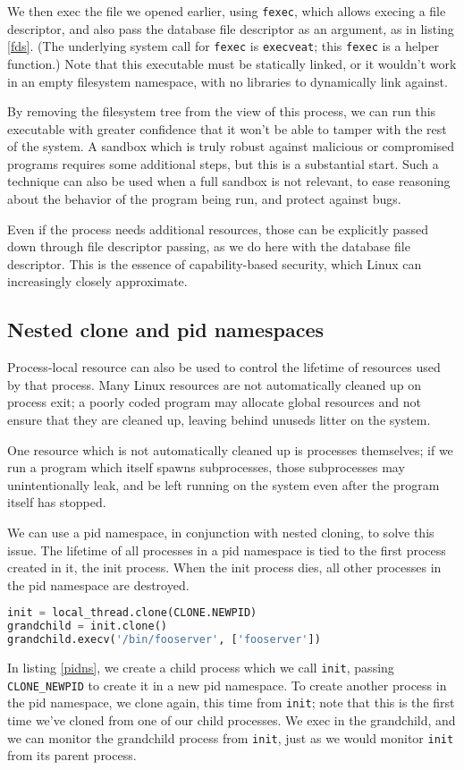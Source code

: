 \documentclass[sigplan]{acmart}
\begin{document}
We then exec the file we opened earlier, using \texttt{fexec},
which allows execing a file descriptor,
and also pass the database file descriptor as an argument,
as in listing \ref{fds}.
(The underlying system call for \texttt{fexec} is \texttt{execveat};
this \texttt{fexec} is a helper function.)
Note that this executable must be statically linked,
or it wouldn't work in an empty filesystem namespace,
with no libraries to dynamically link against.

By removing the filesystem tree from the view of this process,
we can run this executable with greater confidence
that it won't be able to tamper with the rest of the system.
A sandbox which is truly robust against malicious or compromised programs requires some additional steps,
but this is a substantial start.
Such a technique can also be used when a full sandbox is not relevant,
to ease reasoning about the behavior of the program being run,
and protect against bugs.

Even if the process needs additional resources,
those can be explicitly passed down through file descriptor passing,
as we do here with the database file descriptor.
This is the essence of capability-based security,
which Linux can increasingly closely approximate.
\subsection{Nested clone and pid namespaces}
Process-local resource can also be used to control the lifetime of resources used by that process.
Many Linux resources are not automatically cleaned up on process exit;
a poorly coded program may allocate global resources
and not ensure that they are cleaned up,
leaving behind unuseds litter on the system.

One resource which is not automatically cleaned up is processes themselves;
if we run a program which itself spawns subprocesses,
those subprocesses may unintentionally leak,
and be left running on the system even after the program itself has stopped.

We can use a pid namespace, in conjunction with nested cloning, to solve this issue.
The lifetime of all processes in a pid namespace is tied to the first process created in it,
the init process.
When the init process dies,
all other processes in the pid namespace are destroyed.

\begin{lstlisting}[float=*,language=Python,label={pidns},caption={Nested clone and pid namespace}]
init = local_thread.clone(CLONE.NEWPID)
grandchild = init.clone()
grandchild.execv('/bin/fooserver', ['fooserver'])
\end{lstlisting}
In listing \ref{pidns},
we create a child process which we call \texttt{init},
passing \verb|CLONE_NEWPID| to create it in a new pid namespace.
To create another process in the pid namespace,
we clone again, this time from \texttt{init};
note that this is the first time we've cloned from one of our child processes.
We exec in the grandchild,
and we can monitor the grandchild process from \texttt{init},
just as we would monitor \texttt{init} from its parent process.
\end{document}
